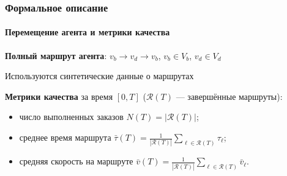 \documentclass[pdf, hyperref={unicode}, aspectratio=169]{beamer}
\begin{document}
\begin{frame}
\frametitle{Формальное описание}
\framesubtitle{Перемещение агента и метрики качества}

\textbf{Полный маршрут агента}: $v_b \to v_d \to v_b$, \quad $v_b \in V_{b}$, $v_d \in V_{d}$

Используются синтетические данные о маршрутах

\bigskip

\textbf{Метрики качества} за время $[0, T]$ ($\mathcal{R}(T)$ --- завершённые маршруты):
\smallskip
\begin{itemize}
    \item число выполненных заказов $N(T) = |\mathcal{R}(T)|$;
    \bigskip
    \item среднее время маршрута $\bar\tau(T) = \frac{1}{|\mathcal{R}(T)|}\sum\limits_{\ell \in \mathcal{R}(T)} \tau_\ell$;
    \medskip
    \item средняя скорость на маршруте $\bar v(T) = \frac{1}{|\mathcal{R}(T)|}\sum\limits_{\ell \in \mathcal{R}(T)} \bar v_\ell$.
\end{itemize}


\end{frame}
\end{document}
